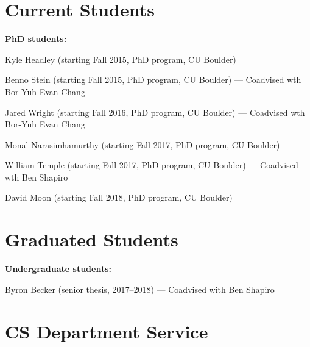 \documentclass[10pt,letterpaper]{article}
\newcommand{\ReviewItem}[1]{\item #1}
\newcommand{\ReviewItemsBegin}{\begin{itemize}}
\newcommand{\ReviewItemsEnd}{\end{itemize}}
\renewenvironment{itemize}{
  \begin{list}{}{
    \setlength{\leftmargin}{1.5em}
    \setlength{\itemsep}{0.25em}
    \setlength{\parskip}{0pt}
    \setlength{\parsep}{0.25em}
  }
}{
  \end{list}
}
\begin{document}
\section*{Current Students}

\noindent
\textbf{PhD students:}
\begin{itemize}
\item Kyle Headley (starting Fall 2015, PhD program, CU Boulder)
\item Benno Stein (starting Fall 2015, PhD program, CU Boulder) --- Coadvised wth Bor-Yuh Evan Chang
\item Jared Wright (starting Fall 2016, PhD program, CU Boulder) --- Coadvised wth Bor-Yuh Evan Chang
\item Monal Narasimhamurthy (starting Fall 2017, PhD program, CU Boulder)
\item William Temple (starting Fall 2017, PhD program, CU Boulder) --- Coadvised wth Ben Shapiro
\item David Moon (starting Fall 2018, PhD program, CU Boulder)
\end{itemize}


\section*{Graduated Students}

\noindent
\textbf{Undergraduate students:}
\begin{itemize}
\item Byron Becker (senior thesis, 2017--2018) --- Coadvised with Ben Shapiro
\end{itemize}



\section*{CS Department Service}
\end{document}
